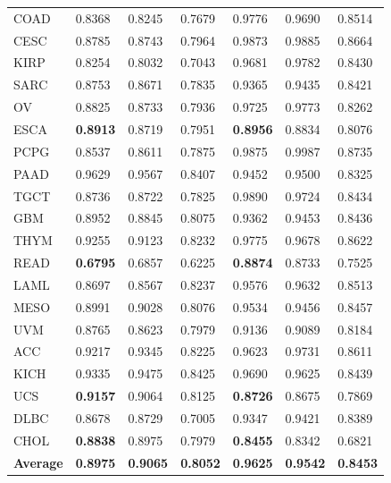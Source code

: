 \begin{table}[h]
\begin{center}
{\begin{tabular}{l|lll|lll}
        COAD   & 0.8368 & 0.8245 & 0.7679 & 0.9776 & 0.9690 & 0.8514  \\%
        CESC   & 0.8785 & 0.8743 & 0.7964 & 0.9873 & 0.9885 & 0.8664  \\%
        KIRP   & 0.8254 & 0.8032 & 0.7043 & 0.9681 & 0.9782 & 0.8430  \\%
        SARC   & 0.8753 & 0.8671 & 0.7835 & 0.9365 & 0.9435 & 0.8421 \\%
        OV     & 0.8825 & 0.8733 & 0.7936 & 0.9725 & 0.9773 & 0.8262  \\%
        ESCA   & {\color{cyan}\textbf{0.8913}} & 0.8719 & 0.7951 &  {\color{cyan}\textbf{0.8956}} & 0.8834 & 0.8076  \\%
        PCPG   & 0.8537 & 0.8611 & 0.7875 & 0.9875 & 0.9987 & 0.8735  \\%
        PAAD   & 0.9629 & 0.9567 & 0.8407 & 0.9452 & 0.9500 & 0.8325  \\%
        TGCT   & 0.8736 & 0.8722 & 0.7825 & 0.9890 & 0.9724 & 0.8434  \\%
        GBM    & 0.8952 & 0.8845 & 0.8075 & 0.9362 & 0.9453 & 0.8436  \\%
        THYM   & 0.9255 & 0.9123 & 0.8232 & 0.9775 & 0.9678 & 0.8622  \\%
        READ   & {\color{cyan}\textbf{0.6795}} & 0.6857 & 0.6225 & {\color{cyan}\textbf{0.8874}} & 0.8733 & 0.7525  \\%
        LAML   & 0.8697 & 0.8567 & 0.8237 & 0.9576 & 0.9632 & 0.8513  \\%
        MESO   & 0.8991 & 0.9028 & 0.8076 & 0.9534 & 0.9456 & 0.8457  \\%
        UVM    & 0.8765 & 0.8623 & 0.7979 & 0.9136 & 0.9089 & 0.8184  \\%
        ACC    & 0.9217 & 0.9345 & 0.8225 & 0.9623 & 0.9731 & 0.8611  \\%
        KICH   & 0.9335 & 0.9475 & 0.8425 & 0.9690 & 0.9625 & 0.8439  \\%
        UCS    & {\color{cyan}\textbf{0.9157}} & 0.9064 & 0.8125 & {\color{cyan}\textbf{0.8726}} & 0.8675 & 0.7869  \\%
        DLBC   & 0.8678 & 0.8729 & 0.7005 & 0.9347 & 0.9421 & 0.8389  \\%
        CHOL   & {\color{cyan}\textbf{0.8838}} & 0.8975 & 0.7979 & {\color{cyan}\textbf{0.8455}} & 0.8342 & 0.6821  \\%
        \midrule
        \textbf{Average} &   \textbf{0.8975}    &  \textbf{0.9065} &    \textbf{0.8052}   &  \textbf{0.9625} & \textbf{0.9542} & \textbf{0.8453}\\
        \bottomrule
        \end{tabular}}
        \vspace{-4mm}
    \end{center}
\end{table}

